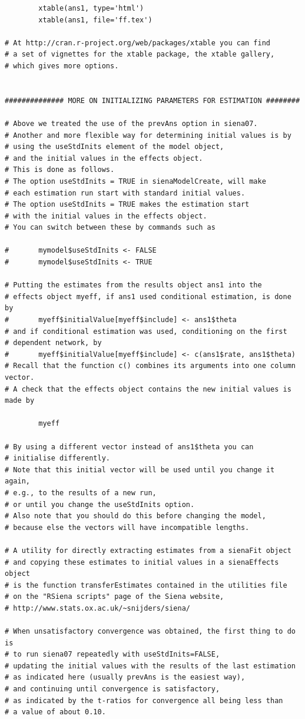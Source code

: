 \documentclass[a4paper,fleqn]{article}
\newcommand{\+}{\, + \,}
\begin{document}
{\begin{verbatim}
        xtable(ans1, type='html')
        xtable(ans1, file='ff.tex')

# At http://cran.r-project.org/web/packages/xtable you can find
# a set of vignettes for the xtable package, the xtable gallery,
# which gives more options.


############## MORE ON INITIALIZING PARAMETERS FOR ESTIMATION ########

# Above we treated the use of the prevAns option in siena07.
# Another and more flexible way for determining initial values is by
# using the useStdInits element of the model object,
# and the initial values in the effects object.
# This is done as follows.
# The option useStdInits = TRUE in sienaModelCreate, will make
# each estimation run start with standard initial values.
# The option useStdInits = TRUE makes the estimation start
# with the initial values in the effects object.
# You can switch between these by commands such as

#       mymodel$useStdInits <- FALSE
#       mymodel$useStdInits <- TRUE

# Putting the estimates from the results object ans1 into the
# effects object myeff, if ans1 used conditional estimation, is done by
#       myeff$initialValue[myeff$include] <- ans1$theta
# and if conditional estimation was used, conditioning on the first
# dependent network, by
#       myeff$initialValue[myeff$include] <- c(ans1$rate, ans1$theta)
# Recall that the function c() combines its arguments into one column vector.
# A check that the effects object contains the new initial values is made by

        myeff

# By using a different vector instead of ans1$theta you can
# initialise differently.
# Note that this initial vector will be used until you change it again,
# e.g., to the results of a new run,
# or until you change the useStdInits option.
# Also note that you should do this before changing the model,
# because else the vectors will have incompatible lengths.

# A utility for directly extracting estimates from a sienaFit object
# and copying these estimates to initial values in a sienaEffects object
# is the function transferEstimates contained in the utilities file
# on the "RSiena scripts" page of the Siena website,
# http://www.stats.ox.ac.uk/~snijders/siena/

# When unsatisfactory convergence was obtained, the first thing to do is
# to run siena07 repeatedly with useStdInits=FALSE,
# updating the initial values with the results of the last estimation
# as indicated here (usually prevAns is the easiest way),
# and continuing until convergence is satisfactory,
# as indicated by the t-ratios for convergence all being less than
# a value of about 0.10.



\end{verbatim}}
\end{document}
